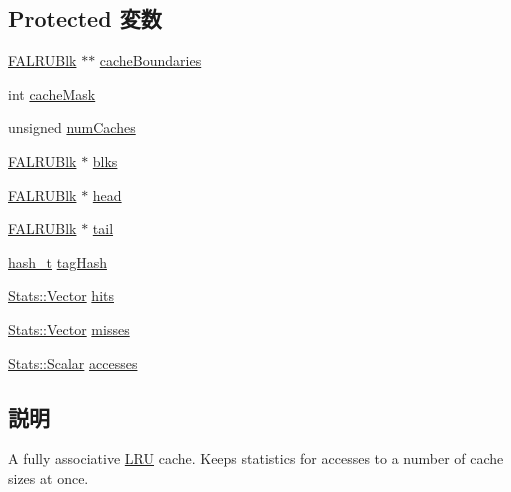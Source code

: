 \subsection*{Protected 変数}
\begin{DoxyCompactItemize}
\item 
\hyperlink{classFALRUBlk}{FALRUBlk} $\ast$$\ast$ \hyperlink{classFALRU_a5d339ffbb2b7d1fc126327a7eaecedc9}{cacheBoundaries}
\item 
int \hyperlink{classFALRU_abf2fa43889270cf9cc3906c2347bc837}{cacheMask}
\item 
unsigned \hyperlink{classFALRU_ae8d599d08408b7259ec22ce188c8a936}{numCaches}
\item 
\hyperlink{classFALRUBlk}{FALRUBlk} $\ast$ \hyperlink{classFALRU_a7493a5b25265aaedfdcf4de5febf03e7}{blks}
\item 
\hyperlink{classFALRUBlk}{FALRUBlk} $\ast$ \hyperlink{classFALRU_a5827e7c04ec688fa822655255fb9643d}{head}
\item 
\hyperlink{classFALRUBlk}{FALRUBlk} $\ast$ \hyperlink{classFALRU_ac959b56dd2bb57a61f6869516a31460d}{tail}
\item 
\hyperlink{classFALRU_adac55c74efec4bdd54e5042924e5cd4d}{hash\_\-t} \hyperlink{classFALRU_a89874e6ace0517ea2a50bae25cbbbf83}{tagHash}
\item 
\hyperlink{classStats_1_1Vector}{Stats::Vector} \hyperlink{group__FALRUStats_ga9fa327cedfd790f651b9218d749c7c73}{hits}
\item 
\hyperlink{classStats_1_1Vector}{Stats::Vector} \hyperlink{group__FALRUStats_gadc50dd8bb92cf864a73d259ac6c67ecd}{misses}
\item 
\hyperlink{classStats_1_1Scalar}{Stats::Scalar} \hyperlink{group__FALRUStats_ga60db2c0b2a8e7ec99712db305f2adf5d}{accesses}
\end{DoxyCompactItemize}


\subsection{説明}
A fully associative \hyperlink{classLRU}{LRU} cache. Keeps statistics for accesses to a number of cache sizes at once. 

